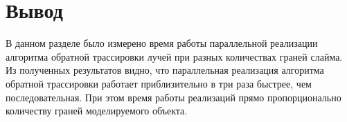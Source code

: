 \section{Вывод}

В данном разделе было измерено время работы параллельной реализации алгоритма обратной трассировки лучей при разных количествах граней слайма. Из полученных результатов видно, что параллельная реализация алгоритма обратной трассировки работает приблизительно в три раза быстрее, чем последовательная. При этом время работы реализаций прямо пропорционально количеству граней моделируемого объекта.

\clearpage

